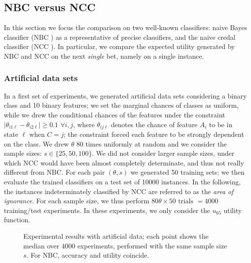 \documentclass[a4paper,10pt,reqno]{amsart}
\theoremstyle{remark}
\begin{document}
\subsection{NBC versus NCC}\label{sec:NBCvsNCC}
In this section we focus the comparison on two well-known classifiers: naive Bayes classifier (NBC \cite{duda1973}) as a representative of precise classifiers, and the naive credal classifier (NCC \cite{zaffalon1999a,zaffalon2001a,corani2008a}). In particular, we compare the expected utility generated by NBC and NCC on the next \emph{single} bet, namely on a single instance. 

\subsubsection{Artificial data sets}
In a first set of experiments, we generated artificial data sets considering a binary class and 10 binary features; we set the marginal chances of classes as uniform, while we drew
the conditional chances of the features under the constraint $|\theta_{i1\ell}-\theta_{i2\ell}|\geq0.1 \,\, \forall i,j$, where $\theta_{ij\ell}$ denotes the chance of feature $A_i$ to be in state $\ell$ when $C=j$; the constraint  forced each feature to be strongly dependent on the class.
We  drew $\theta$ 80 times uniformly at random and we consider the sample sizes: $s\in \{25, 50, 100\}$.
We did not consider larger sample sizes, under which NCC would have been almost completely determinate, and thus not really different from NBC.
For each pair $(\theta,s)$ we generated 50 training sets; we then evaluate the trained classifiers on a test set of 10000 instances.
In the following, the instances indeterminately classified by NCC are referred to as the \emph{area of ignorance}. 
For each sample size, we thus perform $80\theta\times 50\text{ trials }=4000$ training/test experiments.
In these experiments, we only consider the $u_{65}$ utility function.
\begin{figure}[h]
 \caption{Experimental results with artificial data; each point shows the median over 4000 experiments, performed with the same sample size $s$\label{fig:expe}. For NBC, accuracy and utility coincide. }
 \end{figure}
\end{document}

